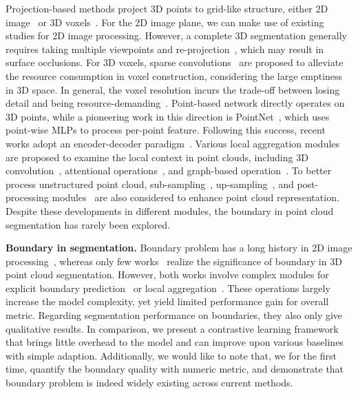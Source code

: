 \documentclass[10pt,twocolumn,letterpaper]{article}
\begin{document}
Projection-based methods project 3D points to grid-like structure, either 2D image~\cite{seg_mv_SqueezeSegV3, seg_mv_RangeNet, vmvf, others_roaddet} or 3D voxels~\cite{Minkowski, ocnn, seg_vx_SEGCloud,occuseg}. 
For the 2D image plane, we can make use of existing studies for 2D image processing. However, a complete 3D segmentation generally requires taking multiple viewpoints and re-projection~\cite{seg_mv_snapNet, seg_mv_proj}, which may result in surface occlusions. For 3D voxels, sparse convolutions~\cite{seg_vx_SSCN, cls_vx_sparseConvSubmanifold,seg_vx_voxsegnet} are proposed to alleviate the resource consumption in voxel construction, considering the large emptiness in 3D space. In general, the voxel resolution incurs the trade-off between losing detail and being resource-demanding~\cite{cls_vox_APkernels}.
Point-based network directly operates on 3D points, while a pioneering work in this direction is PointNet~\cite{pointnet}, which uses point-wise MLPs to process per-point feature. Following this success, recent works adopt an encoder-decoder paradigm~\cite{pointnet++}. Various local aggregation modules are proposed to examine the local context in point clouds, including 3D convolution~\cite{fkaconv, pointcnn,pointconv,kpconv}, attentional operations~\cite{randlanet, pct, pttransformer}, and graph-based operation~\cite{dgcnn,spg}. To better process unstructured point cloud, sub-sampling~\cite{sample,PointASNL,pat,others_sasa}, up-sampling~\cite{seg_baaf,pyramidpoint}, and post-processing modules~\cite{bound_3d_cga,bound_3d_jse} are also considered to enhance point cloud representation.
Despite these developments in different modules, the boundary in point cloud segmentation has rarely been explored.

\noindent\textbf{Boundary in segmentation.}
Boundary problem has a long history in 2D image processing~\cite{bound_sample,bound_bio, bound_iou, bound_loss}, whereas only few works~\cite{bound_3d_pred,bound_3d_jse} realize the significance of boundary in 3D point cloud segmentation. However, both works involve complex modules for explicit boundary prediction~\cite{bound_3d_jse,bound_3d_pred} or local aggregation~\cite{bound_3d_jse}. These operations largely increase the model complexity, yet yield limited performance gain for overall metric. Regarding segmentation performance on boundaries, they also only give qualitative results.
In comparison, we present a contrastive learning framework that brings little overhead to the model and can improve upon various baselines with simple adaption.
Additionally, we would like to note that,
we for the first time,
quantify the boundary quality with numeric metric, and demonstrate that boundary problem is indeed widely existing across current methods.
\end{document}
